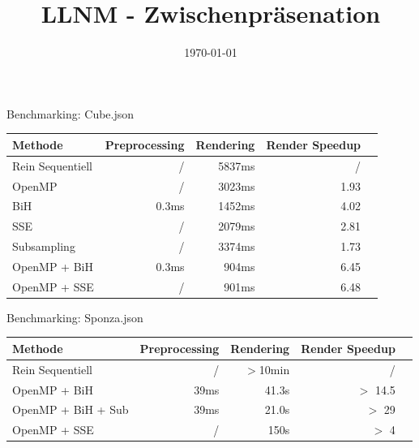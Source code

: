 


\title[LLNM]{LLNM - Zwischenpräsenation}
\subtitle{}
\date{\today}

	\begin{frame}
		\titlepage
	\end{frame}
	\begin{frame}{Benchmarking: Cube.json}
		\begin{tabular}{l*{4}{r}}
		Methode           & Preprocessing & Rendering & Render Speedup \\%
		\hline
		Rein Sequentiell  & /      & 5837ms & /      \\%
		OpenMP            & /      & 3023ms & 1.93   \\%
		BiH               & 0.3ms  & 1452ms & 4.02   \\%
		SSE               & /      & 2079ms & 2.81   \\%
		Subsampling       & /      & 3374ms & 1.73   \\%
		OpenMP + BiH      & 0.3ms  &  904ms & 6.45   \\%
		OpenMP + SSE      & /      &  901ms & 6.48   \\%
		\end{tabular}
	\end{frame}
	\begin{frame}{Benchmarking: Sponza.json}
		\begin{tabular}{l*{4}{r}}
		Methode           & Preprocessing & Rendering & Render Speedup \\%
		\hline
		Rein Sequentiell  & /      & $>$10min & /        \\
		OpenMP + BiH      & 39ms   & 41.3s    & $>$ 14.5 \\
		OpenMP + BiH + Sub  & 39ms   & 21.0s    & $>$ 29 \\
		OpenMP + SSE      & /      & 150s     & $>$ 4    \\
		\end{tabular}
	\end{frame}
